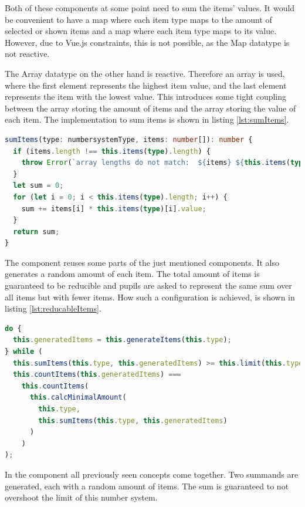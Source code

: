 Both of these components at some point need to sum the items' values. It would be convenient to have a map where each item type maps to the amount of selected or shown items and a map where each item type maps to its value. However, due to Vue.js constraints, this is not possible, as the Map datatype is not reactive.

The Array datatype on the other hand is reactive. Therefore an array is used, where the first element represents the highest item value, and the last element represents the item with the lowest value. This introduces some tight coupling between the array storing the amount of items and the array storing the value of each item. The implementation to sum items is shown in listing \ref{lst:sumItems}.

\begin{lstlisting}[language=TypeScript,caption={Sum up items},label={lst:sumItems}]
sumItems(type: numbersystemType, items: number[]): number {
  if (items.length !== this.items(type).length) {
    throw Error(`array lengths do not match:  ${items} ${this.items(type)}`);
  }
  let sum = 0;
  for (let i = 0; i < this.items(type).length; i++) {
    sum += items[i] * this.items(type)[i].value;
  }
  return sum;
}
\end{lstlisting}

The  component reuses some parts of the just mentioned components. It also generates a random amount of each item. The total amount of items is guaranteed to be reducible and pupils are asked to represent the same sum over all items but with fewer items. How such a configuration is achieved, is shown in listing \ref{lst:reducableItems}.

\begin{lstlisting}[language=TypeScript,caption={Generate a reducible item configuration},label={lst:reducableItems}]
do {
  this.generatedItems = this.generateItems(this.type);
} while (
  this.sumItems(this.type, this.generatedItems) >= this.limit(this.type) ||
  this.countItems(this.generatedItems) ===
    this.countItems(
      this.calcMinimalAmount(
        this.type,
        this.sumItems(this.type, this.generatedItems)
      )
    )
);
\end{lstlisting}

In the  component all previously seen concepts come together. Two summands are generated, each with a random amount of items. The sum is guaranteed to not overshoot the limit of this number system. 